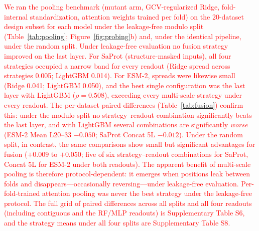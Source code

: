 \documentclass[11pt,a4paper]{article}
\newcommand{\rev}[1]{\textcolor{red}{#1}}
\begin{document}
\textcolor{red}{\rev{We ran the pooling benchmark (mutant arm, GCV-regularized Ridge,
fold-internal standardization, attention weights trained per fold) on the
20-dataset design subset for each model under the leakage-free modulo split
(Table~\ref{tab:pooling}; Figure~\ref{fig:probing}b) and, under the identical
pipeline, under the random split. Under leakage-free evaluation no fusion
strategy improved on the last layer. For SaProt (structure-masked inputs),
all four strategies occupied a narrow band for every readout (Ridge spread
across strategies 0.005; LightGBM 0.014). For ESM-2, spreads were likewise
small (Ridge 0.041; LightGBM 0.050), and the best single configuration was
the last layer with LightGBM ($\rho = 0.508$), exceeding every multi-scale
strategy under every readout. The per-dataset paired differences
(Table~\ref{tab:fusion}) confirm this: under the modulo split no
strategy--readout combination significantly beats the last layer, and with
LightGBM several combinations are significantly \emph{worse} (ESM-2 Mean
L20--33 $-0.050$; SaProt Concat 5L $-0.012$). Under the random split,
in contrast, the same comparisons show small but significant advantages for
fusion ($+0.009$ to $+0.050$; five of six strategy--readout combinations for
SaProt, Concat 5L for ESM-2 under both readouts). The apparent benefit of
multi-scale pooling is therefore protocol-dependent: it emerges when
positions leak between folds and disappears---occasionally reversing---under
leakage-free evaluation. Per-fold-trained attention pooling was never the
best strategy under the leakage-free protocol. The full grid of
paired differences across all splits and all four readouts (including
contiguous and the RF/MLP readouts) is Supplementary Table S6, and the
strategy means under all four splits are Supplementary Table S8.}}
\end{document}
